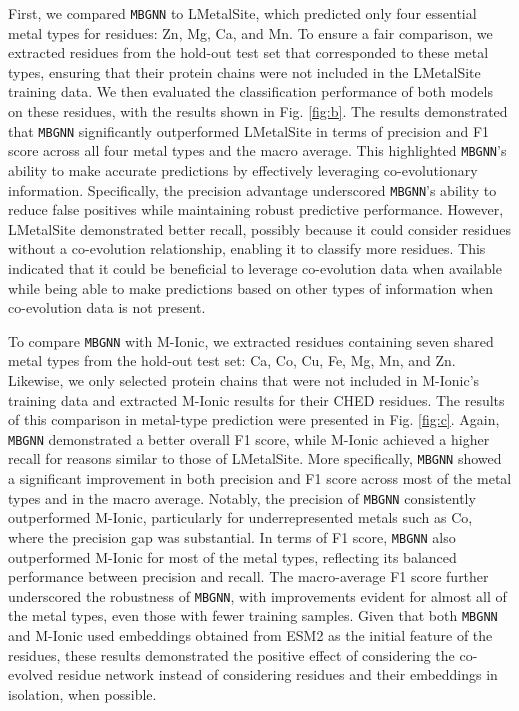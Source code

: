 \documentclass[letterpaper, 10 pt, conference]{ieeeconf}
\begin{document}
First, we compared \texttt{MBGNN} to LMetalSite, which predicted only four essential metal types for residues: Zn, Mg, Ca, and Mn. To ensure a fair comparison, we extracted residues from the hold-out test set that corresponded to these metal types, ensuring that their protein chains were not included in the LMetalSite training data. We then evaluated the classification performance of both models on these residues, with the results shown in Fig. \ref{fig:b}. The results demonstrated that \texttt{MBGNN} significantly outperformed LMetalSite in terms of precision and F1 score across all four metal types and the macro average. This highlighted \texttt{MBGNN}’s ability to make accurate predictions by effectively leveraging co-evolutionary information. Specifically, the precision advantage underscored \texttt{MBGNN}’s ability to reduce false positives while maintaining robust predictive performance. However, LMetalSite demonstrated better recall, possibly because it could consider residues without a co-evolution relationship, enabling it to classify more residues. This indicated that it could be beneficial to leverage co-evolution data when available while being able to make predictions based on other types of information when co-evolution data is not present.

To compare \texttt{MBGNN} with M-Ionic, we extracted residues containing seven shared metal types from the hold-out test set: Ca, Co, Cu, Fe, Mg, Mn, and Zn. Likewise, we only selected protein chains that were not included in M-Ionic's training data and extracted M-Ionic results for their CHED residues. The results of this comparison in metal-type prediction were presented in Fig. \ref{fig:c}. Again, \texttt{MBGNN} demonstrated a better overall F1 score, while M-Ionic achieved a higher recall for reasons similar to those of LMetalSite. More specifically, \texttt{MBGNN} showed a significant improvement in both precision and F1 score across most of the metal types and in the macro average. Notably, the precision of \texttt{MBGNN} consistently outperformed M-Ionic, particularly for underrepresented metals such as Co, where the precision gap was substantial. In terms of F1 score, \texttt{MBGNN} also outperformed M-Ionic for most of the metal types, reflecting its balanced performance between precision and recall. The macro-average F1 score further underscored the robustness of \texttt{MBGNN}, with improvements evident for almost all of the metal types, even those with fewer training samples. Given that both \texttt{MBGNN} and M-Ionic used embeddings obtained from ESM2 as the initial feature of the residues, these results demonstrated the positive effect of considering the co-evolved residue network instead of considering residues and their embeddings in isolation, when possible.
\end{document}
